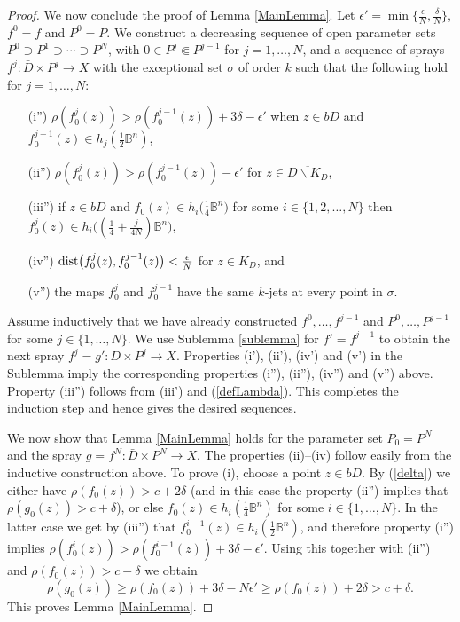 \documentclass[11pt]{amsart}
\numberwithin{equation}{section}
\theoremstyle{definition}
\begin{document}
\begin{proof}
We now conclude the proof of Lemma \ref{MainLemma}.
Let ${\epsilon}'=\min\{\tfrac{\epsilon} N,\tfrac{\delta} N\}$, $f^0=f$ and $P^0=P$. 
We construct a decreasing sequence of 
open parameter sets $P^0\supset P^1\supset\cdots\supset P^N$,
with $0\in P^j{\Subset} P^{j-1}$ for $j=1,\ldots,N$, 
and a sequence of sprays $f^j\colon\bar D\times P^j\to X$ 
with the exceptional set $\sigma$ of order $k$
such that the following hold for $j=1,\ldots, N$:
\begin{itemize}
\item[(i'')] $\rho(f^{j}_0(z))>\rho(f^{j-1}_0(z))+3{\delta}-{\epsilon}'$   
when $z\in bD$ and $f^{j-1}_0(z)\in h_j(\tfrac 12{\mathbb{B}}^n)$, 
\item[(ii'')] $\rho(f^{j}_0(z))>\rho(f^{j-1}_0(z))-{\epsilon}'$ for $z\in \overline{D{\backslash} K_D}$,
\item[(iii'')] if $z\in bD$ and $f_0(z)\in h_i\bigl(\tfrac 14{\mathbb{B}}^n\bigr)$ 
for some $i\in\{1,2,\ldots, N\}$ 
then $f^{j}_0(z)\in h_i\bigl((\tfrac 14+\tfrac{j}{4N}){\mathbb{B}}^n\bigr)$,
\item[(iv'')] ${\rm dist }\bigl(f^{j}_0(z),f^{j-1}_0(z)\bigr)<\tfrac{\epsilon} N$ for $z\in K_D$, and
\item[(v'')] the maps $f^{j}_0$ and $f^{j-1}_0$ 
have the same $k$-jets at every point in $\sigma$.
\end{itemize}

Assume inductively that we have already constructed 
$f^0,\ldots, f^{j-1}$ and $P^0,\ldots,P^{j-1}$ for some 
$j\in\{1,\ldots,N\}$. 
We use Sublemma \ref{sublemma} for $f'=f^{j-1}$ to obtain 
the next spray $f^{j}=g' \colon \bar D\times P^j \to X$.
Properties (i'), (ii'), (iv') and (v') in the Sublemma imply 
the corresponding properties (i''), (ii''), (iv'') and (v'') above. 
Property (iii'') follows from (iii') and (\ref{defLambda}). 
This completes the induction step and hence gives the
desired sequences. 

We now show  that Lemma \ref{MainLemma} holds for  
the parameter set $P_0=P^N$ and 
the spray $g=f^N \colon \bar D\times P^N\to X$. 
The properties (ii)--(iv) follow easily from 
the inductive construction above. To prove (i), choose a point $z\in bD$. 
By (\ref{delta}) we either have $\rho(f_0(z))>c+2{\delta}$ 
(and in this case the property (ii'') implies that $\rho(g_0(z))>c+{\delta}$),
or else $f_0(z)\in h_i(\tfrac14{\mathbb{B}}^n)$ for some $i\in\{1,\ldots,N\}$.
In the latter case we get by (iii'') that 
$f^{i-1}_0(z)\in  h_i(\tfrac12{\mathbb{B}}^n)$, and therefore property (i'') implies 
$\rho(f^{i}_0(z))> \rho(f^{i-1}_0(z))+ 3{\delta}-{\epsilon}'$.        
Using this together with (ii'') and $\rho(f_0(z))>c-\delta$ we obtain
\[
 \rho(g_0(z))\ge \rho(f_0(z))+3{\delta}-N{\epsilon}' \ge \rho(f_0(z))+2 {\delta}>c+{\delta}.
\]
This proves Lemma \ref{MainLemma}.  
\end{proof}
\end{document}
